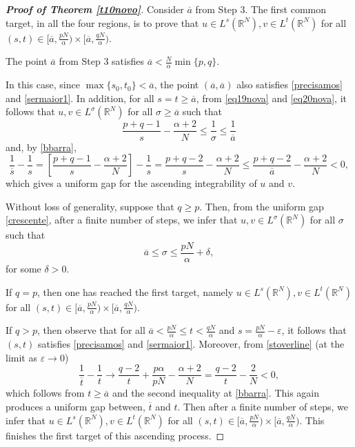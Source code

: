 \documentclass[12pt,a4paper]{article}
\numberwithin{equation}{section}
\begin{document}
\begin{proof}[\bf{Proof of Theorem \ref{t10novo}}]
Consider $\overline{a}$ from Step 3. The first common target, in all the four regions, is to prove that $u \in L^s(\mathbb{R}^N), v \in L^t(\mathbb{R}^N)$ for all $(s,t) \in [\overline{a}, \frac{pN}{\alpha}) \times [\overline{a}, \frac{qN}{\alpha})$.

\medbreak

 The point $\overline{a}$ from Step 3 satisfies $\overline{a} < \frac{N}{\alpha} \min\{p,q\}$.

In this case, since $\max\{s_0, t_0\} < \overline{a}$, the point $(\overline{a}, \overline{a})$ also satisfies \eqref{precisamos} and \eqref{sermaior1}. In addition, for all $s=t\geq \overline{a}$, from \eqref{eq19nova} and \eqref{eq20nova}, it follows that $u, v \in L^{\sigma}(\mathbb{R}^N)$ for all $\sigma \geq \overline{a}$ such that
\[
\dfrac{p+q-1}{s}- \dfrac{\alpha+2}{N} \leq \dfrac{1}{\sigma} \leq \frac{1}{\overline{a}} 
\]
and, by \eqref{bbarra}, 
\begin{equation}\label{crescente}
\dfrac{1}{\overline{s}} - \dfrac{1}{s} = \left[\dfrac{p+q-1}{s}- \dfrac{\alpha+2}{N}\right] -\dfrac{1}{s}= \dfrac{p+q-2}{s} - \dfrac{\alpha+2}{N} \leq \dfrac{p+q-2}{\overline{a}}-\dfrac{\alpha+2}{N}<0,
\end{equation}
which gives a uniform gap for the ascending integrability of $u$ and $v$.

Without loss of generality, suppose that $q\geq p$. Then, from the uniform gap \eqref{crescente}, after a finite number of steps, we infer that $u, v \in L^{\sigma}(\mathbb{R}^N)$ for all $\sigma$ such that
\[
\overline{a} \leq \sigma \leq \frac{pN}{\alpha} + \delta,
\]
for some $\delta>0$. 

If $q=p$, then one has reached the first target, namely $u \in L^s(\mathbb{R}^N), v \in L^t(\mathbb{R}^N)$ for all $(s,t) \in [\overline{a}, \frac{pN}{\alpha}) \times [\overline{a}, \frac{qN}{\alpha})$.

If $q>p$, then observe that for all $\overline{a}<\frac{pN}{\alpha} \leq t < \frac{qN}{\alpha}$ and $s = \frac{pN}{\alpha} - \varepsilon$, it follows that $(s,t)$ satisfies \eqref{precisamos} and \eqref{sermaior1}. Moreover, from \eqref{stoverline} (at the limit as $\varepsilon \to 0$)
\[
\dfrac{1}{\overline{t}} - \frac{1}{t} \to \dfrac{q-2}{t} + \frac{p\alpha}{pN} - \dfrac{\alpha+ 2}{N} = \dfrac{q-2}{t} - \dfrac{2}{N} <0,
\]
which follows from $t \geq \overline{a}$ and the second inequality at \eqref{bbarra}. This again produces a uniform gap between, $\overline{t}$ and $t$. Then after a finite number of steps, we infer that $u \in L^s(\mathbb{R}^N), v \in L^t(\mathbb{R}^N)$ for all $(s,t) \in [\overline{a}, \frac{pN}{\alpha}) \times [\overline{a}, \frac{qN}{\alpha})$. This finishes the first target of this ascending process. 


\end{proof}
\end{document}
